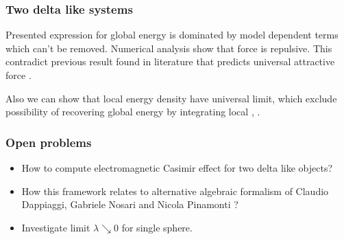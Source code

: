 \documentclass[10pt,t]{beamer}
\begin{document}
\begin{frame}
  \frametitle{Two delta like systems}


  Presented expression for global energy is dominated by model
  dependent terms which can't be removed. Numerical analysis show that
  force is repulsive. This contradict previous result found in
  literature that predicts universal attractive force
  \cite{ScardicchioCasimirDynamics2005}.

  Also we can show that local energy density have universal limit,
  which exclude possibility of recovering global energy by integrating
  local \cite{FermiPizzoccheroLocalCasimirPointImpurity2018},
  \cite{FermiCasimirEnergyAnomalyPointInteraction2020}.

\end{frame}





\begin{frame}
  \frametitle{Open problems}


  \begin{itemize}

  \item How to compute electromagnetic Casimir effect for two delta
    like objects?

  \item How this framework relates to alternative algebraic formalism
    of Claudio Dappiaggi, Gabriele Nosari and Nicola Pinamonti
    \cite{DappiaggiNosariPianamontiCasimirEffectAlgebraic2016}?

  \item Investigate limit $\lambda \searrow 0$ for single sphere.

  \end{itemize}

\end{frame}










\appendix










\end{document}
